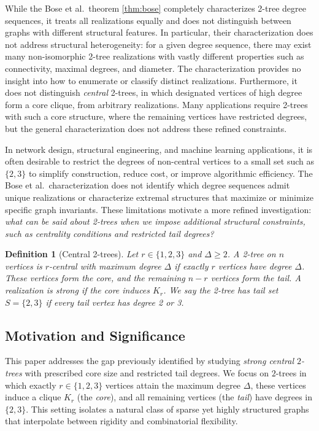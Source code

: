 \documentclass[12pt]{article}
\newtheorem{definition}[theorem]{Definition}
\numberwithin{equation}{section}
\begin{document}
While the Bose et al.\ theorem \ref{thm:bose} completely characterizes 2-tree degree sequences, it treats all realizations equally and does not distinguish between graphs with different structural features.
In particular, their characterization does not address structural heterogeneity: for a given degree sequence, there may exist many non-isomorphic 2-tree realizations with vastly different properties such as connectivity, maximal degrees, and diameter.
The characterization provides no insight into how to enumerate or classify distinct realizations.
Furthermore, it does not distinguish \emph{central} 2-trees, in which designated vertices of high degree form a core clique, from arbitrary realizations.
Many applications require 2-trees with such a core structure, where the remaining vertices have restricted degrees, but the general characterization does not address these refined constraints.

In network design, structural engineering, and machine learning applications, it is often desirable to restrict the degrees of non-central vertices to a small set such as $\{2,3\}$ to simplify construction, reduce cost, or improve algorithmic efficiency.
The Bose et al.\ characterization does not identify which degree sequences admit unique realizations or characterize extremal structures that maximize or minimize specific graph invariants.
These limitations motivate a more refined investigation: \emph{what can be said about 2-trees when we impose additional structural constraints, such as centrality conditions and restricted tail degrees?}

\begin{definition}[Central 2-trees]
\label{def:central}
Let $r\in\{1,2,3\}$ and $\Delta\ge 2$. 
A 2-tree on $n$ vertices is \emph{$r$-central with maximum degree $\Delta$} if exactly $r$ vertices have degree $\Delta$.
These vertices form the \emph{core}, and the remaining $n-r$ vertices form the \emph{tail}.
A realization is \emph{strong} if the core induces $K_r$.
We say the 2-tree has \emph{tail set} $S=\{2,3\}$ if every tail vertex has degree 2 or 3.
\end{definition}

\subsection{Motivation and Significance}

This paper addresses the gap previously identified by studying \emph{strong central $2$-trees} with prescribed core size and restricted tail degrees.
We focus on $2$-trees in which exactly $r\in\{1,2,3\}$ vertices attain the maximum degree $\Delta$, these vertices induce a clique $K_r$ (the \emph{core}), and all remaining vertices (the \emph{tail}) have degrees in $\{2,3\}$.
This setting isolates a natural class of sparse yet highly structured graphs that interpolate between rigidity and combinatorial flexibility.
\end{document}

